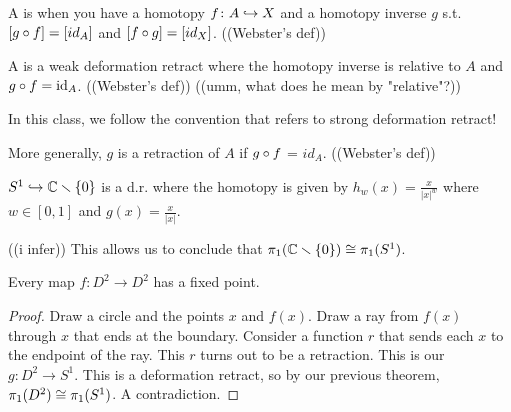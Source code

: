 \documentclass[11pt,leqno,oneside]{amsart}
\numberwithin{thm}{section}
\newcommand{\minus}{\smallsetminus}
\newcommand{\fund}{\pi_1}
\newcommand{\id}{\text{id}}
\begin{document}
\begin{defn}
  A  is when you have a homotopy $f\colon A \hookrightarrow X$ and a homotopy inverse $g$ s.t. $[g \circ f] = [id_A]$ and $[f \circ g] = [id_X]$. ((Webster's def))
\end{defn}
\begin{defn}
  A  is a weak deformation retract where the homotopy inverse is relative to $A$ and $g \of f = \id_A$. ((Webster's def)) ((umm, what does he mean by "relative"?))
\end{defn}
In this class, we follow the convention that  refers to strong deformation retract!
\begin{rmk}
  More generally, $g$ is a retraction of $A$ if $g \circ f$ = $id_A$. ((Webster's def))
\end{rmk}
\begin{example}
  $S^1 \into \C\minus\{0\}$ is a d.r. where the homotopy is given by $h_w(x) = \frac{x}{|x|^w}$ where $w \in [0,1]$  and $g(x) = \frac{x}{|x|}$.

  ((i infer)) This allows us to conclude that $\fund(\C\minus\{0\}) \isom \fund(S^1)$.
\end{example}
\begin{thm}
  Every map $f\colon D^2 \to D^2$ has a fixed point.
\end{thm}



\begin{proof}
  Draw a circle and the points $x$ and $f(x)$.  Draw a ray from $f(x)$ through $x$ that ends at the boundary.  Consider a function $r$ that sends each $x$ to the endpoint of the ray.  This $r$ turns out to be a retraction.  This is our $g\colon D^2 \to S^1$.  This is a deformation retract, so by our previous theorem, $\fund(D^2) \isom \fund(S^1)$.  A contradiction.
\end{proof}
\end{document}
